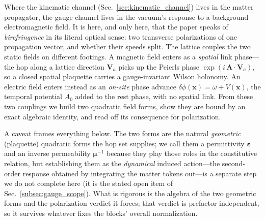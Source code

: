 %
%
%

\label{sec:gauge_sector}

Where the kinematic channel (Sec.~\ref{sec:kinematic_channel}) lives in the matter
propagator, the gauge channel lives in the vacuum's response to a background
electromagnetic field. It is here, and only here, that the paper speaks of
\emph{birefringence} in its literal optical sense: two transverse polarizations
of one propagation vector, and whether their speeds split. The lattice couples the
two static fields on different footings. A magnetic field enters as a \emph{spatial}
link phase---the hop along a lattice direction $\mathbf{V}_a$ picks up the Peierls
phase $\exp(i\,\mathbf{A}\!\cdot\!\mathbf{V}_a)$, so a closed spatial plaquette
carries a gauge-invariant Wilson holonomy. An electric field enters instead as an
\emph{on-site} phase advance $\delta\phi(\mathbf{x}) = \omega + V(\mathbf{x})$, the
temporal potential $A_0$ added to the rest phase, with no spatial link. From these
two couplings we build two quadratic field forms, show they are bound by an exact
algebraic identity, and read off its consequence for polarization.

A caveat frames everything below. The two forms are the natural \emph{geometric}
(plaquette) quadratic forms the hop set supplies; we call them a permittivity
$\boldsymbol{\varepsilon}$ and an inverse permeability $\boldsymbol{\mu}^{-1}$
because they play those roles in the constitutive relation, but establishing them
as the \emph{dynamical} induced action---the second-order response obtained by
integrating the matter tokens out---is a separate step we do not complete here (it
is the stated open item of Sec.~\ref{subsec:gauge_scope}). What is rigorous is the
algebra of the two geometric forms and the polarization verdict it forces; that
verdict is prefactor-independent, so it survives whatever fixes the blocks' overall
normalization.

